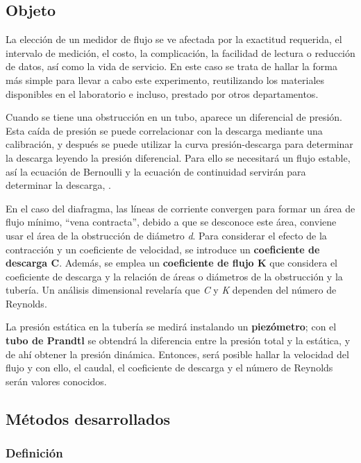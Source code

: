 \subsection{Objeto}\label{header-n246}

La elección de un medidor de flujo se ve afectada por la exactitud
requerida, el intervalo de medición, el costo, la complicación, la
facilidad de lectura o reducción de datos, así como la vida de servicio.
En este caso se trata de hallar la forma más simple para llevar a cabo este
experimento, reutilizando los materiales disponibles en el laboratorio e
incluso, prestado por otros departamentos.

Cuando se tiene una obstrucción en un tubo, aparece un diferencial de
presión. Esta caída de presión se puede correlacionar con la descarga
mediante una calibración, y después se puede utilizar la curva
presión-descarga para determinar la descarga leyendo la presión
diferencial. Para ello se necesitará un flujo estable, así la ecuación
de Bernoulli y la ecuación de continuidad servirán para determinar la
descarga, \cite{Mataix82}.

En el caso del diafragma, las líneas de corriente convergen para formar
un área de flujo mínimo, ``vena contracta'', debido a que se desconoce
este área, conviene usar el área de la obstrucción de diámetro \emph{d}.
Para considerar el efecto de la contracción y un coeficiente de
velocidad, se introduce un \textbf{coeficiente de descarga C}. Además,
se emplea un \textbf{coeficiente de flujo K} que considera el
coeficiente de descarga y la relación de áreas o diámetros de la
obstrucción y la tubería. Un análisis dimensional revelaría que \emph{C}
y \emph{K} dependen del número de Reynolds.

La presión estática en la tubería se medirá instalando un
\textbf{piezómetro}; con el \textbf{tubo de Prandtl} se obtendrá la
diferencia entre la presión total y la estática, y de ahí obtener la
presión dinámica. Entonces, será posible hallar la velocidad del flujo y
con ello, el caudal, el coeficiente de descarga y el número de Reynolds
serán valores conocidos.

\subsection{Métodos desarrollados}\label{header-n257}

\subsubsection{Definición}\label{header-n258}

